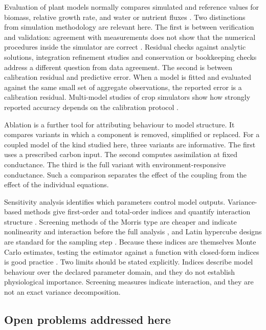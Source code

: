 Evaluation of plant models normally compares simulated and reference values for
biomass, relative growth rate, and water or nutrient fluxes
\cite{Wallach2018,Holzworth2014,Jones2003}. Two distinctions from simulation
methodology are relevant here. The first is between verification and
validation: agreement with measurements does not show that the numerical
procedures inside the simulator are correct \cite{Zeigler2000,Cellier1991}.
Residual checks against analytic solutions, integration refinement studies and
conservation or bookkeeping checks address a different question from data
agreement. The second is between calibration residual and predictive error.
When a model is fitted and evaluated against the same small set of aggregate
observations, the reported error is a calibration residual. Multi-model studies
of crop simulators show how strongly reported accuracy depends on the
calibration protocol \cite{Maiorano2017,Wallach2018}.

Ablation is a further tool for attributing behaviour to model structure. It
compares variants in which a component is removed, simplified or replaced.
For a coupled model of the kind studied here, three variants are informative.
The first uses a prescribed carbon input. The second computes assimilation at
fixed conductance. The third is the full variant with environment-responsive
conductance. Such a comparison separates the effect of the coupling from the
effect of the individual equations.

Sensitivity analysis identifies which parameters control model outputs.
Variance-based methods give first-order and total-order indices and quantify
interaction structure \cite{Sobol2001,Saltelli2010}. Screening methods of the
Morris type are cheaper and indicate nonlinearity and interaction before the
full analysis \cite{Morris1991,Campolongo2007}, and Latin hypercube designs are
standard for the sampling step \cite{McKay1979}. Because these indices are
themselves Monte Carlo estimates, testing the estimator against a function with
closed-form indices is good practice \cite{Ishigami1990}. Two limits should be
stated explicitly. Indices describe model behaviour over the declared parameter
domain, and they do not establish physiological importance. Screening measures
indicate interaction, and they are not an exact variance decomposition.

\subsection{Open problems addressed here}

